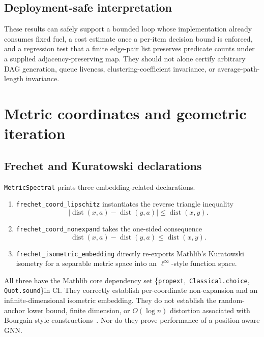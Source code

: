 \documentclass[10pt,letterpaper]{article}
\theoremstyle{definition}
\newcommand{\coretrio}{\{\texttt{propext},\,\allowbreak
  \texttt{Classical.choice},\,\allowbreak\texttt{Quot.sound}\}}
\newcommand{\decl}[1]{\nolinkurl{#1}}
\begin{document}
\subsection{Deployment-safe interpretation}
These results can safely support a bounded loop whose implementation already
consumes fixed fuel, a cost estimate once a per-item decision bound is
enforced, and a regression test that a finite edge-pair list preserves
predicate counts under a supplied adjacency-preserving map. They should not
alone certify arbitrary DAG generation, queue liveness, clustering-coefficient
invariance, or average-path-length invariance.

\section{Metric coordinates and geometric iteration}\label{sec:metric}
\subsection{Frechet and Kuratowski declarations}
\texttt{MetricSpectral} prints three embedding-related declarations.
\begin{enumerate}
\item \decl{frechet_coord_lipschitz} instantiates the reverse triangle
  inequality
  \[
  |\operatorname{dist}(x,a)-\operatorname{dist}(y,a)|
  \leq \operatorname{dist}(x,y).
  \]
\item \decl{frechet_coord_nonexpand} takes the one-sided consequence
  \[
  \operatorname{dist}(x,a)-\operatorname{dist}(y,a)
  \leq \operatorname{dist}(x,y).
  \]
\item \decl{frechet_isometric_embedding} directly re-exports Mathlib's
  Kuratowski isometry for a separable metric space into an
  \(\ell^\infty\)-style function space.
\end{enumerate}
All three have the Mathlib core dependency set \coretrio in CI. They correctly
establish per-coordinate non-expansion and an infinite-dimensional isometric
embedding. They do not establish the random-anchor lower bound, finite
dimension, or \(O(\log n)\) distortion associated with Bourgain-style
constructions~\cite{bourgain1985,llr1995}. Nor do they prove performance of a
position-aware GNN.
\end{document}
